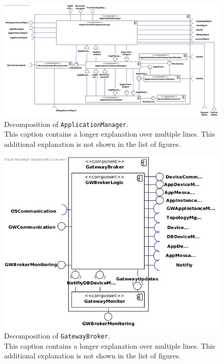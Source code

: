 \begin{landscape}
    \centering
    \vspace*{\fill}

    \begin{figure}[!htp]
    	\centering
    	\includegraphics[width=\linewidth]{images/component-diagram-ApplicationManager}
    	\caption[Decomposition of \texttt{ApplicationManager}]{Decomposition of \texttt{ApplicationManager}.\\
    	This caption contains a longer explanation over multiple lines. This additional explanation is not shown in the list of figures.}\label{fig:decomp-component2}
    \end{figure}

    \vfill
\end{landscape}


\begin{figure}[!htp]
	\centering
	\includegraphics[width=\textwidth]{images/component-diagram-GatewayBroker}
	\caption[Decomposition of \texttt{GatewayBroker}]{Decomposition of \texttt{GatewayBroker}.\\
	This caption contains a longer explanation over multiple lines. This additional explanation is not shown in the list of figures.}\label{fig:decomp-component3}
\end{figure}


